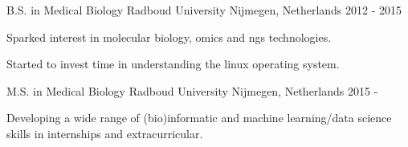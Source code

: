 

\begin{cventries}

  \cventry
    {B.S. in Medical Biology} %
    {Radboud University} %
    {Nijmegen, Netherlands} %
    {2012 - 2015} %
    {
      \begin{cvitems} %
        \item {Sparked interest in molecular biology, omics and ngs technologies.}
        \item {Started to invest time in understanding the linux operating system.}
      \end{cvitems}
    }

  \cventry
    {M.S. in Medical Biology} %
    {Radboud University} %
    {Nijmegen, Netherlands} %
    {2015 - } %
    {
      \begin{cvitems} %
        \item {Developing a wide range of (bio)informatic and machine learning/data science skills in internships and extracurricular.}
      \end{cvitems}
    }


\end{cventries}